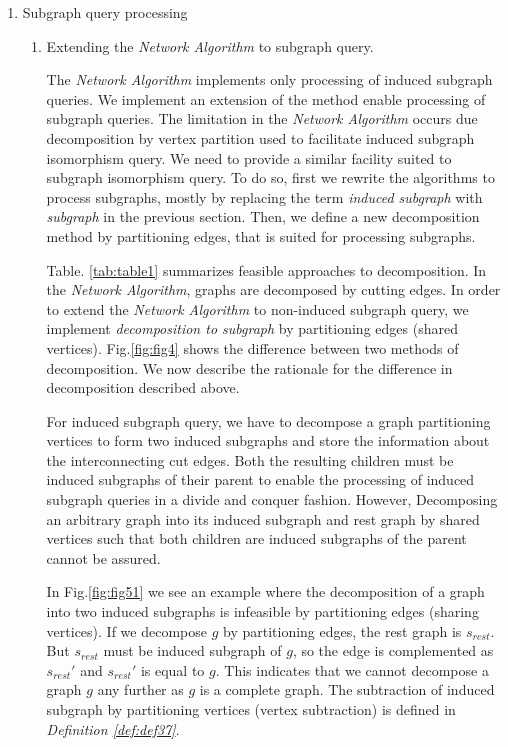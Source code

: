 \begin{enumerate}
\item Subgraph query processing

\begin{enumerate}

\item Extending the \textit{Network Algorithm} to subgraph query.

The \textit{Network Algorithm} implements only processing of induced subgraph queries. We implement an extension of the method enable processing of subgraph queries. The limitation in the \textit{Network Algorithm} occurs due decomposition by vertex partition used to facilitate induced subgraph isomorphism query. We need to provide a similar facility suited to subgraph isomorphism query. To do so, first we rewrite the algorithms to process subgraphs, mostly by replacing the term \textit{induced subgraph} with \textit{subgraph} in the previous section. Then, we define a new decomposition method by partitioning edges, that is suited for processing subgraphs.


Table. \ref{tab:table1} summarizes feasible approaches to decomposition. In the \textit{Network Algorithm}, graphs are decomposed by cutting edges.
In order to extend the \textit{Network Algorithm} to non-induced subgraph query, we implement \textit{decomposition to subgraph} by partitioning edges (shared vertices). Fig.\ref{fig:fig4} shows the difference between two methods of decomposition. We now describe the rationale for the difference in decomposition described above.

For induced subgraph query, we have to decompose a graph partitioning vertices to form two induced subgraphs and store the information about the interconnecting cut edges. Both the resulting children must be induced subgraphs of their parent to enable the processing of induced subgraph queries in a divide and conquer fashion. However, Decomposing an arbitrary graph into its induced subgraph and rest graph by shared vertices such that both children are induced subgraphs of the parent cannot be assured.

In Fig.\ref{fig:fig51} we see an example where the decomposition of a graph into two induced subgraphs is infeasible by partitioning edges (sharing vertices).
If we decompose $g$ by partitioning edges, the rest graph is $s_{rest}$. But $s_{rest}$ must be induced subgraph of $g$, so the edge is complemented as $s_{rest}'$ and $s_{rest}'$ is equal to $g$. This indicates that we cannot decompose a graph $g$ any further as $g$ is a complete graph.
The subtraction of induced subgraph by partitioning vertices (vertex subtraction)  is defined in \textit{Definition \ref{def:def37}}.


\end{enumerate}
\end{enumerate}
